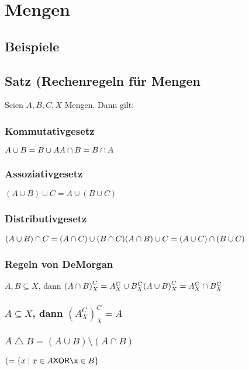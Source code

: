 \documentclass[10pt,a4paper,titlepage,fleqn]{article}
\newcommand{\XOR}{\mathsf{XOR}}
\begin{document}
\section{Mengen}
\subsection{}
\subsection{}
\subsection{}
\subsection{Beispiele}
\subsection{Satz (Rechenregeln für Mengen}
	Seien $A, B , C, X $ Mengen. Dann gilt:\\
\subsubsection{Kommutativgesetz}
	$A\cup B = B\cup A\\
	A\cap B = B\cap A$
\subsubsection{Assoziativgesetz}
	$(A\cup B)\cup C = A\cup (B\cup C)$
\subsubsection{Distributivgesetz}
	$(A\cup B) \cap C = (A\cap C) \cup (B\cap C)\\
	(A\cap B) \cup C = (A\cup C) \cap (B\cup C)$
\subsubsection{Regeln von DeMorgan}
	$A,B \subseteq X$, dann ${(A\cap B)}^C_X=A^C_X\cup B^C_X\\
	{(A\cup B)}^C_X=A^C_X\cap B^C_X$
\subsubsection{$A \subseteq X$, dann ${(A^C_X)}^C_X=A$}
\subsubsection{$A\bigtriangleup B=(A\cup B)\setminus (A\cap B)$}
	$(=\lbrace x\mid x\in A \XOR \x \in B \rbrace$
\end{document}
